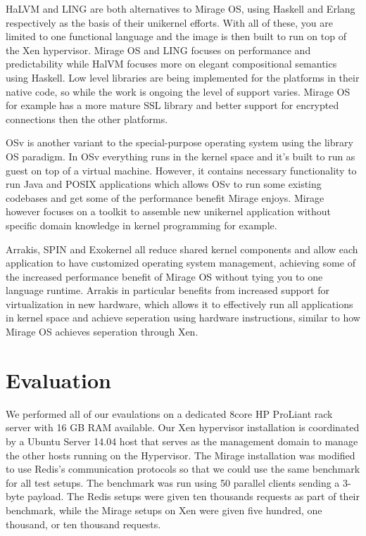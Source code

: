 \documentclass[english,10pt,twocolumn]{article}
\begin{document}
HaLVM\cite{halvm} and LING\cite{ling} are both alternatives to Mirage OS, using Haskell and Erlang respectively as the basis of their unikernel efforts. With all of these, you are limited to one functional language and the image is then built to run on top of the Xen hypervisor. Mirage OS and LING focuses on performance and predictability while HalVM focuses more on elegant compositional semantics using Haskell. Low level libraries are being implemented for the platforms in their native code, so while the work is ongoing the level of support varies. Mirage OS for example has a more mature SSL library and better support for encrypted connections then the other platforms.

OSv\cite{osv} is another variant to the special-purpose operating system using the library OS paradigm. In OSv everything runs in the kernel space and it's built to run as guest on top of a virtual machine. However, it contains necessary functionality to run Java and POSIX applications which allows OSv to run some existing codebases and get some of the performance benefit Mirage enjoys. Mirage however focuses on a toolkit to assemble new unikernel application without specific domain knowledge in kernel programming for example.

Arrakis\cite{arrakis}, SPIN\cite{spin} and Exokernel\cite{exokernel} all reduce shared kernel components and allow each application to have customized operating system management, achieving some of the increased performance benefit of Mirage OS without tying you to one language runtime.  Arrakis in particular benefits from increased support for virtualization in new hardware, which allows it to effectively run all applications in kernel space and achieve seperation using hardware instructions, similar to how Mirage OS achieves seperation through Xen.

\section{Evaluation}

We performed all of our evaulations on a dedicated 8\-core HP ProLiant rack server with 16 GB RAM available.
Our Xen hypervisor installation is coordinated by a Ubuntu Server 14.04 host that serves as the management domain to manage the other hosts running on the Hypervisor.
The Mirage installation was modified to use Redis's communication protocols so that we could use the same benchmark for all test setups. The benchmark was run using 50 parallel clients sending a 3-byte payload. 
The Redis setups were given ten thousands requests as part of their benchmark, while the Mirage setups on Xen were given five hundred, one thousand, or ten thousand requests.
\end{document}
